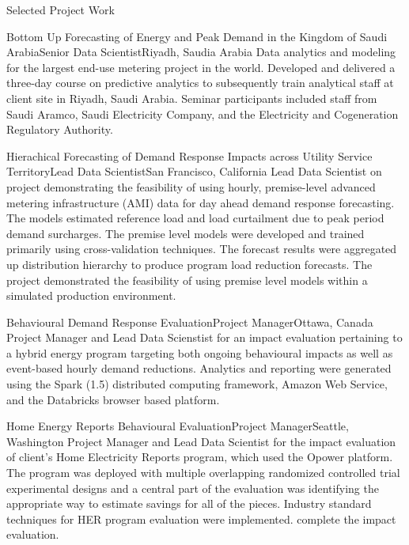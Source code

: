 \documentclass{resume} %
\begin{document}
	\begin{rSection}{Selected Project Work}
	
	\begin{rSubsection}{Bottom Up Forecasting of Energy and Peak Demand in the Kingdom of Saudi Arabia}{}{Senior Data Scientist}{Riyadh, Saudia Arabia}
	Data analytics and modeling for the largest end-use metering project in the world. Developed and delivered a three-day course on predictive analytics to subsequently train analytical staff at client site in Riyadh, Saudi Arabia. Seminar participants included staff from Saudi Aramco, Saudi Electricity Company, and the Electricity and Cogeneration Regulatory Authority. 
	
	\end{rSubsection}
	
	\begin{rSubsection}{Hierachical Forecasting of Demand Response Impacts across Utility Service Territory}{}{Lead Data Scientist}{San Francisco, California}
	Lead Data Scientist on project demonstrating the feasibility of using hourly, premise-level advanced metering infrastructure (AMI) data for day ahead demand response forecasting. The models estimated         reference load and load curtailment due to peak period demand surcharges. The premise level models were developed and trained primarily using cross-validation techniques. The forecast results were aggregated up distribution hierarchy to produce program load reduction forecasts. The project demonstrated the feasibility of using premise level models within a simulated production environment.
	\end{rSubsection}
	
	\begin{rSubsection}{Behavioural Demand Response Evaluation}{}{Project Manager}{Ottawa, Canada}
	Project Manager and Lead Data Scienstist for an impact evaluation pertaining to a hybrid energy program targeting both ongoing behavioural impacts as well as event-based hourly demand reductions. Analytics and reporting were generated using the Spark (1.5) distributed computing framework, Amazon Web Service, and the Databricks browser based platform. 
	\end{rSubsection}
	
	\begin{rSubsection}{Home Energy Reports Behavioural Evaluation}{}{Project Manager}{Seattle, Washington}
Project Manager and Lead Data Scientist for the impact evaluation of client's Home Electricity Reports program, which used the Opower platform. The program was deployed with multiple overlapping randomized controlled trial experimental designs and a central part of the evaluation was identifying the appropriate way to estimate savings for all of the pieces.   Industry standard techniques for HER program evaluation were implemented. complete the impact evaluation.
	\end{rSubsection}  
	

\end{rSection}
\end{document}
